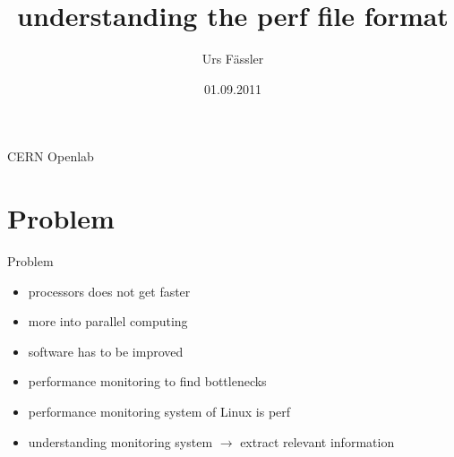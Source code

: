 
\usepackage[utf8]{inputenc}
\usepackage{amsmath}
\usepackage{amsfonts}
\usepackage{amssymb}
\usepackage{multicol}
\usepackage{graphicx}
\usepackage{tikz}
\usetikzlibrary{arrows,positioning,shapes}
\usepackage{listings}
\usepackage{multicol}
\usepackage{appendixnumberbeamer}
\usepackage{pstricks}
\usepackage{marvosym}
\usepackage[backend=bibtex]{biblatex}

\newcommand{\code}[1]{\texttt{#1}}

\title{understanding the perf file format}
\author{Urs F\"assler}
\date{01.09.2011}
\institute
{
  CERN Openlab
}

%


\beamertemplatenavigationsymbolsempty




\begin{frame}[plain]
  \titlepage
\end{frame}

\setcounter{framenumber}{0}

\section{Problem}
\begin{frame}{Problem}
\begin{itemize}
  \item processors does not get faster
  \item more into parallel computing
  \item software has to be improved
\pause
  \item performance monitoring to find bottlenecks
  \item performance monitoring system of Linux is perf
  \item understanding monitoring system $\rightarrow$ extract relevant information
\end{itemize}
\end{frame}

